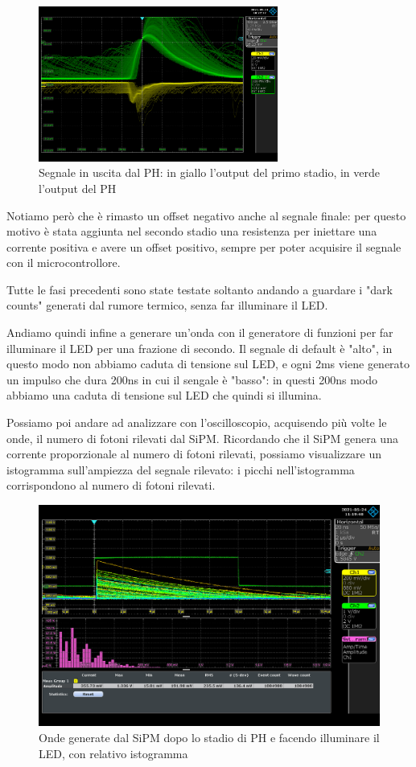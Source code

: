 \begin{figure}[H]
\centering
\includegraphics[width=0.7\textwidth]{assets/exp9/inv_g_42.png}
\caption{Segnale in uscita dal PH: in giallo l'output del primo stadio, in verde l'output del PH}
\end{figure}

Notiamo però che è rimasto un offset negativo anche al segnale finale: per questo motivo è stata aggiunta nel secondo stadio una resistenza per iniettare una corrente positiva e avere un offset positivo, sempre per poter acquisire il segnale con il microcontrollore.

Tutte le fasi precedenti sono state testate soltanto andando a guardare i "dark counts" generati dal rumore termico, senza far illuminare il LED.

Andiamo quindi infine a generare un'onda con il generatore di funzioni per far illuminare il LED per una frazione di secondo. Il segnale di default è "alto", in questo modo non abbiamo caduta di tensione sul LED, e ogni 2ms viene generato un impulso che dura 200ns in cui il sengale è "basso": in questi 200ns modo abbiamo una caduta di tensione sul LED che quindi si illumina.

Possiamo poi andare ad analizzare con l'oscilloscopio, acquisendo più volte le onde, il numero di fotoni rilevati dal SiPM. Ricordando che il SiPM genera una corrente proporzionale al numero di fotoni rilevati, possiamo visualizzare un istogramma sull'ampiezza del segnale rilevato: i picchi nell'istogramma corrispondono al numero di fotoni rilevati.

\begin{figure}[H]
\centering
\includegraphics[width=\textwidth]{assets/exp9/sipm_oscilloscopio_istogramma.png}
\caption{Onde generate dal SiPM dopo lo stadio di PH e facendo illuminare il LED, con relativo istogramma}
\end{figure}

